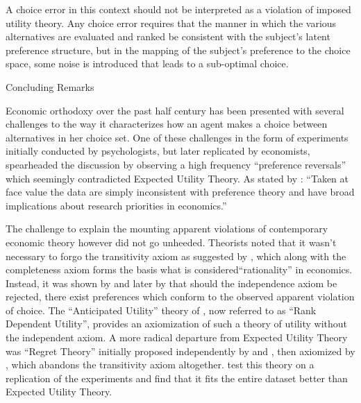 \documentclass[11pt,a4paper]{report}
\begin{document}
A choice error in this context should not be interpreted as a violation of imposed utility theory.
Any choice error requires that the manner in which the various alternatives are evaluated and ranked be consistent with the subject's latent preference structure, but in the mapping of the subject's preference to the choice space, some noise is introduced that leads to a sub-optimal choice.

Concluding Remarks

Economic orthodoxy over the past half century has been presented with several challenges to the way it characterizes how an agent makes a choice between alternatives in her choice set.
One of these challenges in the form of experiments initially conducted by psychologists, but later replicated by economists, spearheaded the discussion by observing a high frequency \enquote{preference reversals} which seemingly contradicted Expected Utility Theory.
As stated by \textcite{Grether1979}: \enquote{Taken at face value the data are simply inconsistent with preference theory and have broad implications about research priorities in economics.}

The challenge to explain the mounting apparent violations of contemporary economic theory however did not go unheeded.
Theorists noted that it wasn't necessary to forgo the transitivity axiom as suggested by \textcite[623]{Grether1979}, which along with the completeness axiom forms the basis what is considered\enquote{rationality} in economics.
Instead, it was shown by \textcite{Holt1986} and later by \textcite{Karni1987} that should the independence axiom be rejected, there exist preferences which conform to the observed apparent violation of choice.
The \enquote{Anticipated Utility} theory of \textcite{Quiggin1982}, now referred to as \enquote{Rank Dependent Utility}, provides an axiomization of such a theory of utility without the independent axiom.
A more radical departure from Expected Utility Theory was \enquote{Regret  Theory} initially proposed independently by \textcite{Bell1982} and \textcite{Loomes1982}, then axiomized by \textcite{Fishburn1987}, which abandons the transitivity axiom altogether.
\textcite{Loomes1989} test this theory on a replication of the \textcite{Grether1979} experiments and find that it fits the entire dataset better than Expected Utility Theory.
\end{document}
